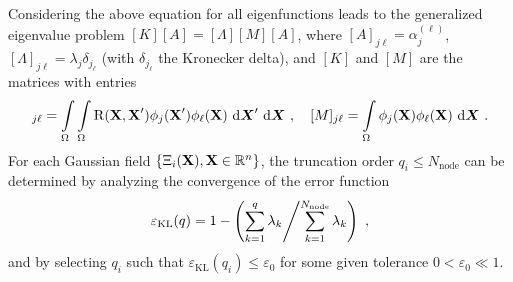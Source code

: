 Considering the above equation for all eigenfunctions leads to the generalized eigenvalue problem $[K] [A] = [\Lambda] [M] [A]$, where $[A]_{j\ell} = \alpha_j^{(\ell)}$, $[\Lambda]_{j\ell} = \lambda_j \delta_{j_\ell}$ (with $\delta_{j_\ell}$ the Kronecker delta), and $[K]$ and $[M]$ are the matrices with entries
\begin{align}
  [K]_{j\ell} = \int\limits_\body \int\limits_\body \cor(\btX,\btX') \phi_j(\btX')\phi_\ell(\btX) \diff{\bfX}' \diff{\bfX}~, \quad [M]_{j\ell} = \int\limits_\body \phi_j(\btX)\phi_\ell(\btX) \diff{\bfX}~.
\end{align}
For each Gaussian field $\{\Xi_i(\textbf{X}), \textbf{X} \in \mathbb{R}^n\}$, the truncation order $q_i \leqslant N_{\text{node}}$ can be determined by analyzing the convergence of the error function
\begin{align}
  \varepsilon_{\text{KL}}(q) = 1-\left( \sum\limits_{k=1}^q \lambda_k \middle/ \sum\limits_{k=1}^{N_\text{node}} \lambda_k \right)~, \label{eq: truncation}
\end{align}
and by selecting $q_i$ such that $\varepsilon_{\text{KL}}(q_i) \leqslant \varepsilon_0$ for some given tolerance $0 < \varepsilon_0 \ll 1$.
